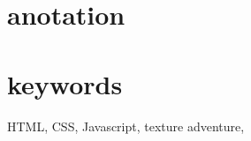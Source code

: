 \documentclass[main.tex]{subfiles}
\begin{document}
\section{anotation}


\section{keywords}
HTML, CSS, Javascript, texture adventure, 
\end{document}
